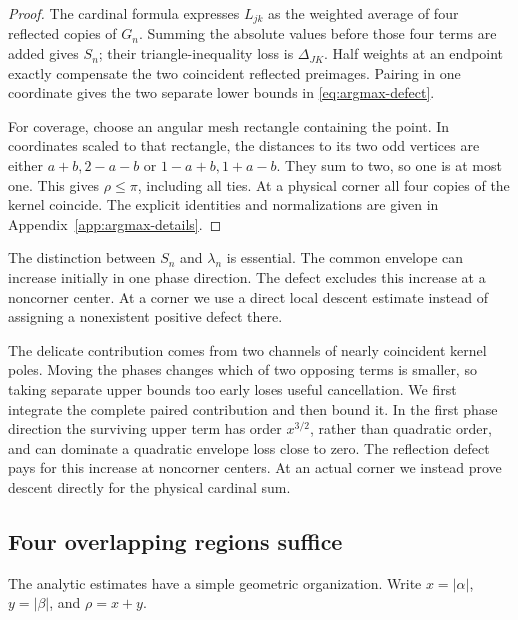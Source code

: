 \begin{proof}
The cardinal formula expresses $L_{jk}$ as the weighted average of four
reflected copies of $G_n$.  Summing the absolute values before those
four terms are added gives $S_n$; their triangle-inequality loss is
$\Delta_{JK}$.  Half weights at an endpoint exactly compensate the two
coincident reflected preimages.  Pairing in one coordinate gives the
two separate lower bounds in \eqref{eq:argmax-defect}.

For coverage, choose an angular mesh rectangle containing the point.
In coordinates scaled to that rectangle, the distances to its two odd
vertices are either $a+b,2-a-b$ or $1-a+b,1+a-b$.  They sum to two,
so one is at most one.  This gives $\rho\leq\pi$, including all ties.
At a physical corner all four copies of the kernel coincide.  The
explicit identities and normalizations are given in
Appendix~\ref{app:argmax-details}.
\end{proof}

The distinction between $S_n$ and $\lambda_n$ is essential.  The common
envelope can increase initially in one phase direction.  The defect
excludes this increase at a noncorner center.  At a corner we use a
direct local descent estimate instead of assigning a nonexistent
positive defect there.

The delicate contribution comes from two channels of nearly coincident
kernel poles.  Moving the phases changes which of two opposing terms is
smaller, so taking separate upper bounds too early loses useful
cancellation.  We first integrate the complete paired contribution and
then bound it.  In the first phase direction the surviving upper term
has order $x^{3/2}$, rather than quadratic order, and can dominate a
quadratic envelope loss close to zero.  The reflection defect pays for
this increase at noncorner centers.  At an actual corner we instead
prove descent directly for the physical cardinal sum.

\subsection{Four overlapping regions suffice}

The analytic estimates have a simple geometric organization.  Write
$x=|\alpha|$, $y=|\beta|$, and $\rho=x+y$.

